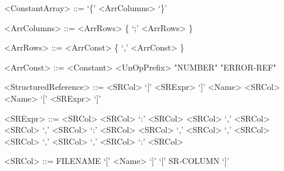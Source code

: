 \begin{grammar}
	
	<ConstantArray> ::= `\{' <ArrColumns> `\}'
	
	<ArrColumns> ::= <ArrRows> \{ `;' <ArrRows> \}
	
	<ArrRows> ::= <ArrConst> \{ `,' <ArrConst> \}
	
	<ArrConst> ::= <Constant>
	\alt <UnOpPrefix> "NUMBER"
	\alt "ERROR-REF"
	
	<StructuredReference> ::= <SRCol>
	\alt `[' <SRExpr> `]'
	\alt <Name> <SRCol>
	\alt <Name> `[' <SRExpr> `]'
	
	<SRExpr> ::= <SRCol>
	\alt <SRCol> `:' <SRCol>
	\alt <SRCol> `,' <SRCol>
	\alt <SRCol> `,' <SRCol> `:' <SRCol>
	\alt <SRCol> `,' <SRCol> `,' <SRCol>
	\alt <SRCol> `,' <SRCol> `,' <SRCol> `:' <SRCol>
	
	<SRCol> ::= FILENAME
	\alt `[' <Name> `]'  
	\alt `[' SR-COLUMN `]'  
	
	
	
\end{grammar}